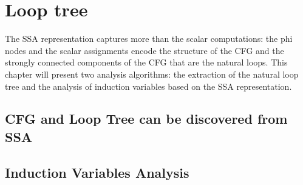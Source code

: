 \chapter{Loop tree }

The SSA representation captures more than the scalar computations: the
phi nodes and the scalar assignments encode the structure of the CFG
and the strongly connected components of the CFG that are the natural
loops.  This chapter will present two analysis algorithms: the
extraction of the natural loop tree and the analysis of induction
variables based on the SSA representation.

\section{CFG and Loop Tree can be discovered from SSA}
\section{Induction Variables Analysis}

